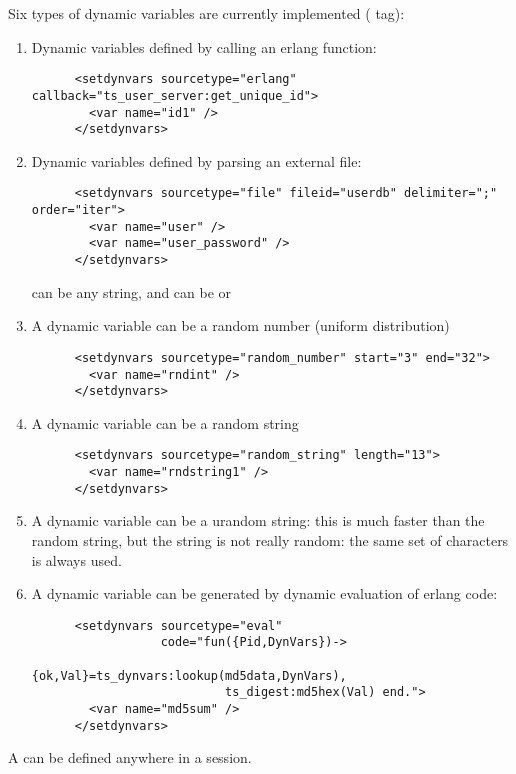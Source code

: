\documentclass{TSUNG-en}
\begin{document}
Six types of dynamic variables are currently implemented ( tag):
\begin{enumerate}
\item Dynamic variables defined by calling an erlang function:
\begin{Verbatim}
      <setdynvars sourcetype="erlang" callback="ts_user_server:get_unique_id">
        <var name="id1" />
      </setdynvars>
\end{Verbatim}
\item Dynamic variables defined by parsing an external file:
\begin{Verbatim}
      <setdynvars sourcetype="file" fileid="userdb" delimiter=";" order="iter">
        <var name="user" />
        <var name="user_password" />
      </setdynvars>
\end{Verbatim}
 can be any string, and  can be
 or 
\item A dynamic variable can be a random number (uniform distribution)
\begin{Verbatim}
      <setdynvars sourcetype="random_number" start="3" end="32">
        <var name="rndint" />
      </setdynvars>
\end{Verbatim}
\item A dynamic variable can be a random string
\begin{Verbatim}
      <setdynvars sourcetype="random_string" length="13">
        <var name="rndstring1" />
      </setdynvars>
\end{Verbatim}
\item A dynamic variable can be a urandom string: this is much faster than
  the random string, but the string is not really random: the same set
  of characters is always used.
\item A dynamic variable can be generated by dynamic evaluation of
  erlang code:
\begin{Verbatim}
      <setdynvars sourcetype="eval"
                  code="fun({Pid,DynVars})->
                           {ok,Val}=ts_dynvars:lookup(md5data,DynVars),
                           ts_digest:md5hex(Val) end.">
        <var name="md5sum" />
      </setdynvars>
\end{Verbatim}

\end{enumerate}

A  can be defined anywhere in a session.
\end{document}
